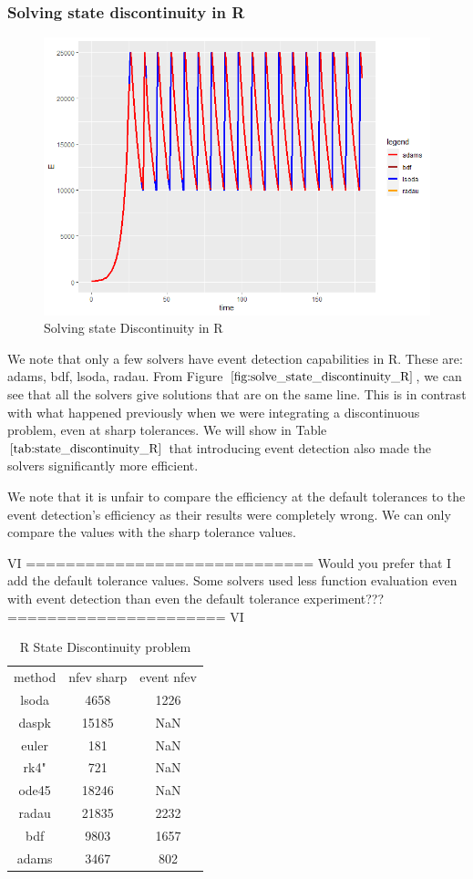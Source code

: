 \subsubsection{Solving state discontinuity in R}
\begin{figure}[h]
	\centering
	\includegraphics[width=0.7\linewidth]{./figures/solve_state_discontinuity_R}
	\caption{Solving state Discontinuity in R}
	\label{fig:solve_state_discontinuity_R}
\end{figure}
We note that only a few solvers have event detection capabilities in R. These are: adams, bdf, lsoda, radau. From Figure $\ref{fig:solve_state_discontinuity_R}$, we can see that all the solvers give solutions that are on the same line. This is in contrast with what happened previously when we were integrating a discontinuous problem, even at sharp tolerances. We will show in Table $\ref{tab:state_discontinuity_R}$ that introducing event detection also made the solvers significantly more efficient. 

We note that it is unfair to compare the efficiency at the default tolerances to the event detection's efficiency as their results were completely wrong. We can only compare the values with the sharp tolerance values.

VI =============================
Would you prefer that I add the default tolerance values. Some solvers used less function evaluation even with event detection than even the default tolerance experiment???
====================== VI

\begin{table}[h]
\caption {R State Discontinuity problem} 
\label{tab:state_discontinuity_R}
\begin{center}
\begin{tabular}{ c c c } 
method & nfev sharp & event nfev \\ 
lsoda & 4658  & 1226  \\
daspk & 15185 & NaN   \\
euler & 181   & NaN   \\
rk4"  & 721   & NaN   \\
ode45 & 18246 & NaN   \\
radau & 21835 & 2232  \\
bdf   & 9803  & 1657  \\
adams & 3467  & 802   \\
\end{tabular}
\end{center}
\end{table}

